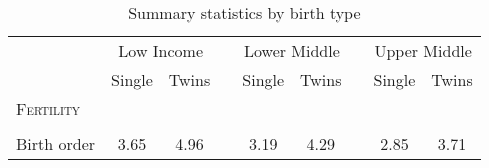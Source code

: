 \documentclass{article}[11pt,subeqn]
\begin{document}
\begin{spacing}{1.5}


\begin{table}[ht]
\caption{Summary statistics by birth type}
\label{tab:missing}
\vspace{-7mm}
\begin{center}
\begin{tabular}{lccp{5mm}ccp{5mm}cc} 
\toprule
  & \multicolumn{2}{c}{Low Income} & & \multicolumn{2}{c}{Lower Middle}& & \multicolumn{2}{c}{Upper Middle} \\ \cmidrule(r){2-3} \cmidrule(r){5-6} \cmidrule(r){8-9} 
 & Single & Twins && Single & Twins&& Single & Twins \\ \midrule
\textsc{Fertility} & & &&&&&& \\																
\begin{footnotesize}\end{footnotesize}	&	\begin{footnotesize}\end{footnotesize}	&	\begin{footnotesize}\end{footnotesize}	&	\begin{footnotesize}\end{footnotesize} &	\begin{footnotesize}\end{footnotesize}	&	\begin{footnotesize}\end{footnotesize}	&	\begin{footnotesize}\end{footnotesize} &	\begin{footnotesize}\end{footnotesize}	&	\begin{footnotesize}\end{footnotesize}		\\
Birth order	&	3.65	&	4.96	&	&	3.19	&	4.29	&	&	2.85	&	3.71		\\

\end{tabular}
\end{center}
\end{table}
\end{spacing}
\end{document}
